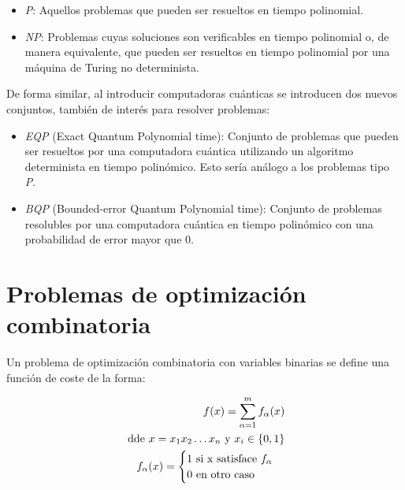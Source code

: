 \begin{itemize}
\item \textit{P}: Aquellos problemas que pueden ser resueltos en tiempo polinomial.
\item \textit{NP}: Problemas cuyas soluciones son verificables en tiempo polinomial o, de manera equivalente, que pueden ser resueltos en tiempo polinomial por una máquina de Turing no determinista.
\end{itemize}

De forma similar, al introducir computadoras cuánticas se introducen dos nuevos conjuntos, también de interés para resolver problemas:

\begin{itemize}
\item \textit{EQP} (Exact Quantum Polynomial time): Conjunto de problemas que pueden ser resueltos por una computadora cuántica utilizando un algoritmo determinista en tiempo polinómico. Esto sería análogo a los problemas tipo \textit{P}.
\item \textit{BQP} (Bounded-error Quantum Polynomial time): Conjunto de problemas resolubles por una computadora cuántica en tiempo polinómico con una probabilidad de error mayor que 0.
\end{itemize}

\section{Problemas de optimización combinatoria\label{sec:2-problemas de optimizacion combinatoria}}

Un problema de optimización combinatoria con variables binarias se define una función de coste de la forma:

\begin{align*}
  f(x) = \sum_{\alpha = 1}^{m} f_\alpha(x) \\
  \textnormal{ dde } x = x_1x_2 \ldots x_n \textnormal{ y } x_i\in{\{0, 1\}} \\
   f_{\alpha}(x) = \begin{cases}
     1 \textnormal{ si x satisface } f_\alpha \\
     0 \textnormal{ en otro caso}
   \end{cases}
\end{align*}


